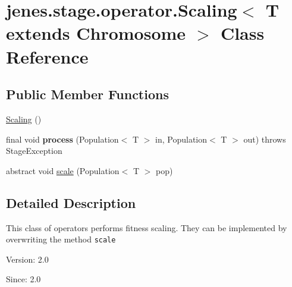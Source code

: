 \hypertarget{classjenes_1_1stage_1_1operator_1_1_scaling_3_01_t_01extends_01_chromosome_01_4}{
\section{jenes.stage.operator.Scaling$<$ T extends Chromosome $>$ Class Reference}
\label{classjenes_1_1stage_1_1operator_1_1_scaling_3_01_t_01extends_01_chromosome_01_4}
}
\subsection*{Public Member Functions}
\begin{CompactItemize}
\item 
\hyperlink{classjenes_1_1stage_1_1operator_1_1_scaling_3_01_t_01extends_01_chromosome_01_4_04089dfb0f712c85ca27fdbab69a5b9e}{Scaling} ()
\item 
\hypertarget{classjenes_1_1stage_1_1operator_1_1_scaling_3_01_t_01extends_01_chromosome_01_4_1577b3956323b5110e4c740ccaaa5905}{
final void \textbf{process} (Population$<$ T $>$ in, Population$<$ T $>$ out)  throws StageException }
\label{classjenes_1_1stage_1_1operator_1_1_scaling_3_01_t_01extends_01_chromosome_01_4_1577b3956323b5110e4c740ccaaa5905}

\item 
abstract void \hyperlink{classjenes_1_1stage_1_1operator_1_1_scaling_3_01_t_01extends_01_chromosome_01_4_e72d4b2ab8bd3504471ce67788c841cd}{scale} (Population$<$ T $>$ pop)
\end{CompactItemize}


\subsection{Detailed Description}
This class of operators performs fitness scaling. They can be implemented by overwriting the method {\tt scale}

\begin{Desc}
\item[Version:]2.0 \end{Desc}
\begin{Desc}
\item[Since:]2.0 \end{Desc}


